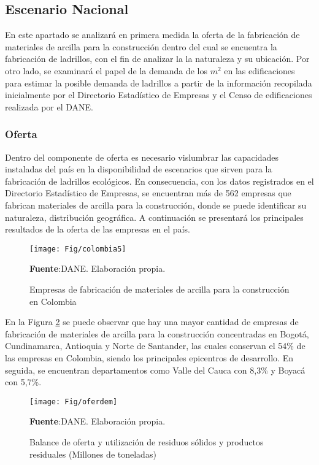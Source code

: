 \documentclass[12pt]{article}
\begin{document}
\subsection{Escenario Nacional}
En este apartado se analizará en primera medida la oferta de la fabricación  de materiales de arcilla para la construcción dentro del cual se encuentra la fabricación de ladrillos, con el fin de analizar la la naturaleza y su ubicación. Por otro lado, se examinará el papel de la demanda de los $m^{2}$ en las edificaciones para estimar la posible demanda de ladrillos a partir de la información recopilada inicialmente por el Directorio Estadístico de Empresas y el Censo de edificaciones realizada por el DANE. 
\subsubsection{Oferta}
Dentro del componente de oferta es necesario vislumbrar las capacidades instaladas del país en la disponibilidad de escenarios que sirven para la fabricación de ladrillos ecológicos. En consecuencia, con los datos registrados en el Directorio Estadístico de Empresas, se encuentran más de 562 empresas que fabrican materiales de arcilla para la construcción, donde se puede identificar su naturaleza, distribución geográfica. A continuación se presentará los principales resultados de la oferta de las empresas en el país.
\begin{figure}[H]
  	\centering 		
  	\caption{Empresas de fabricación  de materiales de arcilla para la construcción en Colombia}
	\texttt{[image: Fig/colombia5]}
\raggedright  \scriptsize \textbf{Fuente}:DANE. Elaboración propia.
	\label{2}	
	\end{figure}

En la Figura \ref{2} se puede observar que hay una mayor cantidad de empresas de fabricación  de materiales de arcilla para la construcción concentradas en Bogotá, Cundinamarca, Antioquia y Norte de Santander, las cuales conservan el 54\% de las empresas en Colombia, siendo los principales epicentros de desarrollo. En seguida, se encuentran departamentos como Valle del Cauca con 8,3\% y Boyacá con 5,7\%.



	\begin{figure}[H]
  	\centering 		
  	\caption{Balance de oferta y utilización de residuos sólidos y productos residuales (Millones de toneladas)}
	\texttt{[image: Fig/oferdem]}
\raggedright  \scriptsize \textbf{Fuente}:DANE. Elaboración propia.
	\label{2}	
	\end{figure}
\end{document}
